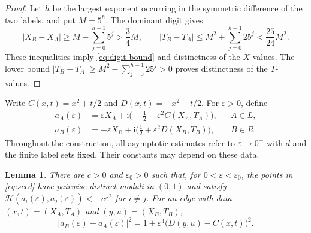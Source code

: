 \documentclass[a4paper,11pt]{amsart}
\newtheorem{lemma}[theorem]{Lemma}
\theoremstyle{remark}
\newcommand{\ii}{\mathrm i}
\newcommand{\Hh}{\mathcal H}
\begin{document}
\begin{proof}
Let $h$ be the largest exponent occurring in the symmetric difference
of the two labels, and put $M=5^h$.
The dominant digit gives
\[
 |X_B-X_A|\ge M-\sum_{j=0}^{h-1}5^j>\frac34M,\qquad
 |T_B-T_A|\le M^2+\sum_{j=0}^{h-1}25^j<\frac{25}{24}M^2.
\]
These inequalities imply \eqref{eq:digit-bound} and distinctness of the
$X$-values. The lower bound
$|T_B-T_A|\ge M^2-\sum_{j=0}^{h-1}25^j>0$ proves distinctness of the
$T$-values.
\end{proof}

Write $C(x,t)=x^2+t/2$ and $D(x,t)=-x^2+t/2$.
For $\varepsilon>0$, define
\begin{equation}\label{eq:seed}
 \begin{aligned}
 a_A(\varepsilon)
   &=\varepsilon X_A+\ii\bigl(-\tfrac12+
                    \varepsilon^2 C(X_A,T_A)\bigr),&&A\in L,\\
 a_B(\varepsilon)
   &=-\varepsilon X_B+\ii\bigl(\tfrac12+
                    \varepsilon^2 D(X_B,T_B)\bigr),&&B\in R.
 \end{aligned}
\end{equation}
Throughout the construction, all asymptotic estimates refer to
$\varepsilon\to0^+$ with $d$ and the finite label sets fixed.
Their constants may depend on these data.

\begin{lemma}\label{lem:seed}
There are $c>0$ and $\varepsilon_0>0$ such that, for
$0<\varepsilon<\varepsilon_0$, the points in \eqref{eq:seed} have
pairwise distinct moduli in $(0,1)$ and satisfy
$\Hh(a_i(\varepsilon),a_j(\varepsilon))<-c\varepsilon^2$ for $i\ne j$.
For an edge with data $(x,t)=(X_A,T_A)$ and $(y,u)=(X_B,T_B)$,
\begin{equation}\label{eq:distance-error}
 |a_B(\varepsilon)-a_A(\varepsilon)|^2
 =1+\varepsilon^4\bigl(D(y,u)-C(x,t)\bigr)^2.
\end{equation}
\end{lemma}
\end{document}
